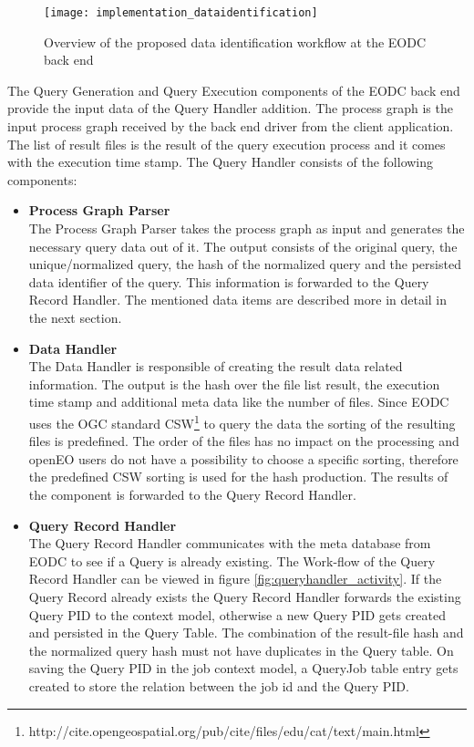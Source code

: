 \documentclass[draft,final]{vutinfth} %
\begin{document}
\begin{figure}[h]
	\centering
	\texttt{[image: implementation\_dataidentification]}
	\caption{Overview of the proposed data identification workflow at the EODC back end}
	\label{fig:impldataid} %
\end{figure}

The Query Generation and Query Execution components of the EODC back end provide the input data of the Query Handler addition. The process graph is the input process graph received by the back end driver from the client application. The list of result files is the result of the query execution process and it comes with the execution time stamp. The Query Handler consists of the following components:

 \begin{itemize}
	\item \textbf{Process Graph Parser} \\
	The Process Graph Parser takes the process graph as input and generates the necessary query data out of it. The output consists of the original query, the unique/normalized query, the hash of the normalized query and the persisted data identifier of the query. This information is forwarded to the Query Record Handler. The mentioned data items are described more in detail in the next section.  
	\item \textbf{Data Handler} \\ 
	The Data Handler is responsible of creating the result data related information. The output is the hash over the file list result, the execution time stamp and additional meta data like the number of files. Since EODC uses the OGC standard CSW\footnote{http://cite.opengeospatial.org/pub/cite/files/edu/cat/text/main.html} to query the data the sorting of the resulting files is predefined. The order of the files has no impact on the processing and openEO users do not have a possibility to choose a specific sorting, therefore the predefined CSW sorting is used for the hash production. The results of the component is forwarded to the Query Record Handler.    
	\item \textbf{Query Record Handler} \\
	The Query Record Handler communicates with the meta database from EODC to see if a Query is already existing. The Work-flow of the Query Record Handler can be viewed in figure \ref{fig:queryhandler_activity}. If the Query Record already exists the Query Record Handler forwards the existing Query PID to the context model, otherwise a new Query PID gets created and persisted in the Query Table. The combination of the result-file hash and the normalized query hash must not have duplicates in the Query table. On saving the Query PID in the job context model, a QueryJob table entry gets created to store the relation between the job id and the Query PID. 
	
\end{itemize}
\end{document}
